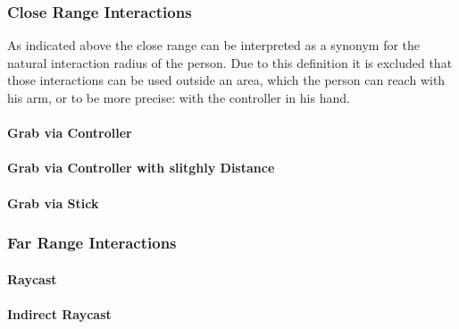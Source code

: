 \subsubsection{Close Range Interactions}\label{sec:CloseRange}
As indicated above the close range can be interpreted as a synonym for the natural interaction radius of the person. Due to this definition it is excluded that those interactions can be used outside an area, which the person can reach with his arm, or to be more precise: with the controller in his hand. 

\paragraph{Grab via Controller} \label{sec:ControllerGrab}

\paragraph{Grab via Controller with slitghly Distance} \label{sec:DistantControllerGrab}
\paragraph{Grab via Stick} \label{sec:StickGrab}

\subsubsection{Far Range Interactions}\label{sec:FarRange}

\paragraph{Raycast} \label{sec:Raycast}
\paragraph{Indirect Raycast} \label{sec:IndirectRaycast}
